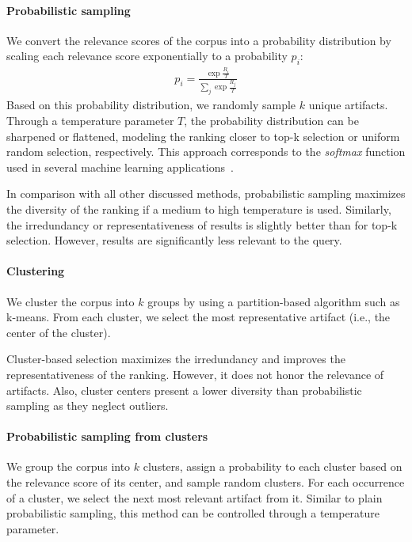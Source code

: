 \paragraph{Probabilistic sampling}
We convert the relevance scores of the corpus into a probability distribution by scaling each relevance score exponentially to a probability $p_i$:
\begin{align}
	p_i = \frac{\exp \frac{R_i}{T}}{\sum_j \exp \frac{R_j}{T}}
\end{align}
Based on this probability distribution, we randomly sample $k$ unique artifacts.
Through a temperature parameter $T$, the probability distribution can be sharpened or flattened, modeling the ranking closer to top-k selection or uniform random selection, respectively.
This approach corresponds to the \emph{softmax} function used in several machine learning applications~\cite{vaswani2017attention}.

In comparison with all other discussed methods, probabilistic sampling maximizes the diversity of the ranking if a medium to high temperature is used.
Similarly, the irredundancy or representativeness of results is slightly better than for top-k selection.
However, results are significantly less relevant to the query.

\paragraph{Clustering}
We cluster the corpus into $k$ groups by using a partition-based algorithm such as k-means.
From each cluster, we select the most representative artifact (i.e., the center of the cluster).

Cluster-based selection maximizes the irredundancy and improves the representativeness of the ranking.
However, it does not honor the relevance of artifacts.
Also, cluster centers present a lower diversity than probabilistic sampling as they neglect outliers.

\paragraph{Probabilistic sampling from clusters}
We group the corpus into $k$ clusters, assign a probability to each cluster based on the relevance score of its center, and sample random clusters.
For each occurrence of a cluster, we select the next most relevant artifact from it.
Similar to plain probabilistic sampling, this method can be controlled through a temperature parameter.

